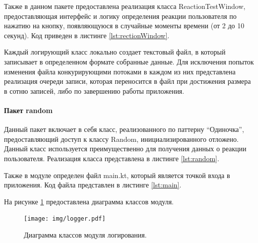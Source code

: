 





Также в данном пакете предоставлена реализация класса ReactionTestWindow, предоставляющая интерфейс и логику определения реакции пользователя по нажатию на кнопку, появляющуюся в случайные моменты времени (от 2 до 10 секунд). Код приведен в листинге \ref{lst:rectionWindow}.



Каждый логирующий класс локально создает текстовый файл, в который записывает в определенном формате собранные данные. Для исключения попыток изменения файла конкурирующими потоками в каждом из них представлена реализация очереди записи, которая переносится в файл при достижения размера в сотню записей, либо по завершению работы приложения.

\paragraph{Пакет random}
Данный пакет включает в себя класс, реализованного по паттерну ``Одиночка'', предоставляющий доступ к классу Random, инициализированного отложено. Данный класс используется преимущественно для получения данных о реакции пользователя. Реализация класса представлена в листинге \ref{lst:random}.



Также в модуле определен файл main.kt, который является точкой входа в приложения. Код файла представлен в листинге \ref{lst:main}.



На рисунке \ref{fig:loggingUml} предоставлена диаграмма классов модуля.
\begin{figure}[H]
	\centering
	\texttt{[image: img/logger.pdf]}
	\caption{Диаграмма классов модуля логирования.}
	\label{fig:loggingUml}
\end{figure}

